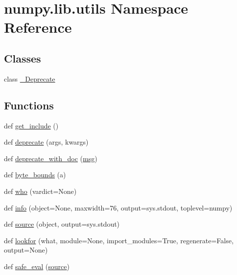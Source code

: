 \hypertarget{namespacenumpy_1_1lib_1_1utils}{}\section{numpy.\+lib.\+utils Namespace Reference}
\label{namespacenumpy_1_1lib_1_1utils}
\subsection*{Classes}
\begin{DoxyCompactItemize}
\item 
class \hyperlink{classnumpy_1_1lib_1_1utils_1_1__Deprecate}{\+\_\+\+Deprecate}
\end{DoxyCompactItemize}
\subsection*{Functions}
\begin{DoxyCompactItemize}
\item 
def \hyperlink{namespacenumpy_1_1lib_1_1utils_af88a4119737ebfe13e2d9b9eb50a09c5}{get\+\_\+include} ()
\item 
def \hyperlink{namespacenumpy_1_1lib_1_1utils_a8ae7926cae438885f67fcbe036308672}{deprecate} (args, kwargs)
\item 
def \hyperlink{namespacenumpy_1_1lib_1_1utils_ad068e6779e539248b179200225a11910}{deprecate\+\_\+with\+\_\+doc} (\hyperlink{namespacenumpy_ab96122eb8e44294b488b0ef93ec27d38}{msg})
\item 
def \hyperlink{namespacenumpy_1_1lib_1_1utils_a2f515d59bad0ace5083748a31b82155f}{byte\+\_\+bounds} (a)
\item 
def \hyperlink{namespacenumpy_1_1lib_1_1utils_a26df04e9904b2e3349eaff91896cc156}{who} (vardict=None)
\item 
def \hyperlink{namespacenumpy_1_1lib_1_1utils_a20bd9fdff36ab4476ff840623e0e62f9}{info} (object=None, maxwidth=76, output=sys.\+stdout, toplevel=\textquotesingle{}numpy\textquotesingle{})
\item 
def \hyperlink{namespacenumpy_1_1lib_1_1utils_a95d697b2cd971f6f15b6d6643afd0fae}{source} (object, output=sys.\+stdout)
\item 
def \hyperlink{namespacenumpy_1_1lib_1_1utils_ad34dd70d113be622ed9a750e9c99de9a}{lookfor} (what, module=None, import\+\_\+modules=True, regenerate=False, output=None)
\item 
def \hyperlink{namespacenumpy_1_1lib_1_1utils_a5439fed5d1eee86e9616441b8bdda46e}{safe\+\_\+eval} (\hyperlink{namespacenumpy_1_1lib_1_1utils_a95d697b2cd971f6f15b6d6643afd0fae}{source})
\end{DoxyCompactItemize}


